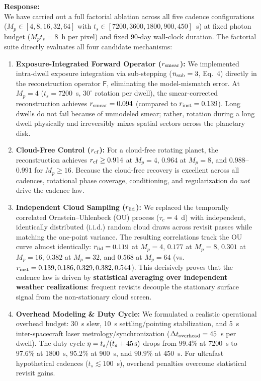 \documentclass[11pt]{article}
\begin{document}
\textbf{Response:}\\[1mm]
We have carried out a full factorial ablation across all five cadence configurations ($M_p \in [4, 8, 16, 32, 64]$ with $t_s \in [7200, 3600, 1800, 900, 450]$~s) at fixed photon budget ($M_p t_s = 8$~h per pixel) and fixed 90-day wall-clock duration. The factorial suite directly evaluates all four candidate mechanisms:
\begin{enumerate}
\item \textbf{Exposure-Integrated Forward Operator ($r_{\rm smear}$):} We implemented intra-dwell exposure integration via sub-stepping ($n_{\rm sub}=3$, Eq.~4) directly in the reconstruction operator $\mathsf{F}$, eliminating the model-mismatch error. At $M_p=4$ ($t_s=7200$~s, $30^\circ$ rotation per dwell), the smear-corrected reconstruction achieves $r_{\rm smear}=0.094$ (compared to $r_{\rm inst}=0.139$). Long dwells do not fail because of unmodeled smear; rather, rotation during a long dwell physically and irreversibly mixes spatial sectors across the planetary disk.
\item \textbf{Cloud-Free Control ($r_{\rm cf}$):} For a cloud-free rotating planet, the reconstruction achieves $r_{\rm cf} \ge 0.914$ at $M_p=4$, $0.964$ at $M_p=8$, and $0.988$--$0.991$ for $M_p \ge 16$. Because the cloud-free recovery is excellent across all cadences, rotational phase coverage, conditioning, and regularization do \textit{not} drive the cadence law.
\item \textbf{Independent Cloud Sampling ($r_{\rm iid}$):} We replaced the temporally correlated Ornstein--Uhlenbeck (OU) process ($\tau_c=4$~d) with independent, identically distributed (i.i.d.) random cloud draws across revisit passes while matching the one-point variance. The resulting correlations track the OU curve almost identically: $r_{\rm iid} = 0.119$ at $M_p=4$, $0.177$ at $M_p=8$, $0.301$ at $M_p=16$, $0.382$ at $M_p=32$, and $0.568$ at $M_p=64$ (vs.\ $r_{\rm inst} = 0.139, 0.186, 0.329, 0.382, 0.544$). This decisively proves that the cadence law is driven by \textbf{statistical averaging over independent weather realizations}: frequent revisits decouple the stationary surface signal from the non-stationary cloud screen.
\item \textbf{Overhead Modeling \& Duty Cycle:} We formulated a realistic operational overhead budget: 30~s slew, 10~s settling/pointing stabilization, and 5~s inter-spacecraft laser metrology/synchronization ($\Delta t_{\rm overhead} = 45$~s per dwell). The duty cycle $\eta = t_s / (t_s + 45\,{\rm s})$ drops from $99.4\%$ at 7200~s to $97.6\%$ at 1800~s, $95.2\%$ at 900~s, and $90.9\%$ at 450~s. For ultrafast hypothetical cadences ($t_s \lesssim 100$~s), overhead penalties overcome statistical revisit gains.
\end{enumerate}
\end{document}

